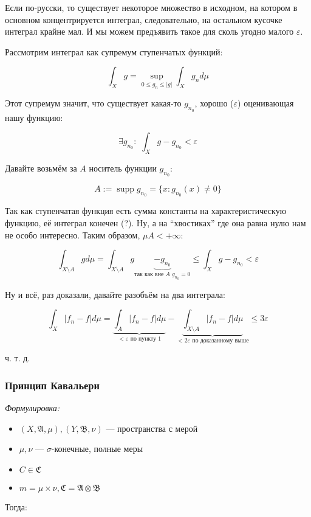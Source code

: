 \documentclass{article}
\def\dbl{\,\,}
\DeclareMathOperator{\supp}{supp}
\begin{document}
Если по-русски, то существует некоторое множество в исходном, на котором в основном концентрируется интеграл, следовательно, на остальном кусочке интеграл крайне мал. И мы можем предъявить такое для сколь угодно малого $\varepsilon$.

Рассмотрим интеграл как супремум ступенчатых функций:

\[\int_{X} g = \sup_{0 \le g_n \le |g|} \int_{X} g_n d\mu\]

Этот супремум значит, что существует какая-то $g_{n_0}$, хорошо ($\varepsilon$) оценивающая нашу функцию:

\[\exists g_{n_0}: \dbl \int_{X} g - g_{n_0} < \varepsilon\]

Давайте возьмём за $A$ носитель функции $g_{n_0}$:

\[A := \supp g_{n_0} = \{x: g_{n_0}(x) \neq 0\}\]

Так как ступенчатая функция есть сумма константы на характеристическую функцию, её интеграл конечен (?). Ну, а на ``хвостиках'' где она равна нулю нам не особо интересно. Таким образом, $\mu A < + \infty$:

\[\int_{X \setminus A} g d\mu = \int_{X \setminus A} g \underbrace{- g_{n_0}}_{\text{так как вне } A \,\, g_{n_0} = 0} \le \int_{X} g - g_{n_0} < \varepsilon\]

Ну и всё, раз доказали, давайте разобъём на два интеграла:

\[\int_{X} |f_n - f| d\mu = \underbrace{\int_{A} |f_n - f| d\mu}_{< \varepsilon \text{ по пункту 1}} - \underbrace{\int_{X \setminus A} |f_n - f| d\mu}_{<2 \varepsilon \text{ по доказанному выше}} \le 3 \varepsilon\]

ч. т. д. 

\subsubsection{Принцип Кавальери}
\textit{Формулировка:}

\begin{itemize}
    \item $(X, \mathfrak{A}, \mu), (Y, \mathfrak{B}, \nu)$ --- пространства с мерой
    \item $\mu, \nu$ --- $\sigma$-конечные, полные меры
    \item $C \in \mathfrak{C}$
    \item $m = \mu \times \nu, \mathfrak{C} = \mathfrak{A} \otimes \mathfrak{B}$
\end{itemize}

Тогда: 
\end{document}
